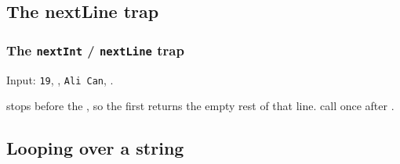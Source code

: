 \documentclass[aspectratio=169,10pt,compress]{beamer}
\begin{document}
\subsection[Trap]{The nextLine trap}




\begin{frame}[t,fragile] \frametitle{The \texttt{nextInt} / \texttt{nextLine} trap}

  \vspace{0.3em}
  \small Input: 
  \texttt{19}, , 
  \texttt{Ali Can}, . 
  
   stops before the , so the first
   returns the empty rest of that line. 
   call  once after .
\end{frame}







\subsection[Loop]{Looping over a string}
\end{document}
